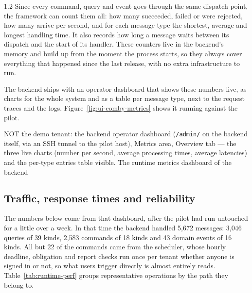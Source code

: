\begin{spacing}{1.2}
Since every command, query and event goes through the same dispatch point,
the framework can count them all: how many succeeded, failed or were
rejected, how many arrive per second, and for each message type the
shortest, average and longest handling time. It also records how long
a message waits between its dispatch and the start of its handler.
These counters live in the backend's memory and build up from the
moment the process starts, so they always cover everything that
happened since the last release, with no extra infrastructure to run.

The backend ships with an operator dashboard that shows these numbers
live, as charts for the whole system and as a table per message type,
next to the request traces and the logs. 
Figure~\ref{fig:ui-comby-metrics} shows it running against the pilot.

  {NOT the demo tenant: the backend operator dashboard
   (\texttt{/admin/} on the backend itself, via an SSH tunnel to the
   pilot host), Metrics area, Overview tab --- the three live charts
   (number per second, average processing times, average latencies)
   and the per-type entries table visible.}
  {The runtime metrics dashboard of the backend}

\subsection{Traffic, response times and reliability}
\label{sec:runtime-measured}

The numbers below come from that dashboard, after the pilot had run
untouched for a little over a week. In that time the backend handled
5{,}672 messages: 3{,}046 queries of 39 kinds, 2{,}583 commands of 18
kinds and 43 domain events of 16 kinds. All but 22 of the commands came
from the scheduler, whose hourly deadline, obligation and report checks
run once per tenant whether anyone is signed in or not, so what users
trigger directly is almost entirely reads.
Table~\ref{tab:runtime-perf} groups representative operations by the
path they belong to.


\end{spacing}
